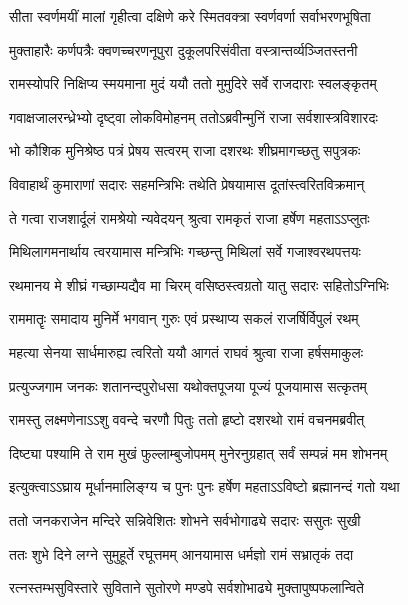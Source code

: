 \twolineshloka
{सीता स्वर्णमयीं मालां गृहीत्वा दक्षिणे करे}
{स्मितवक्त्रा स्वर्णवर्णा सर्वाभरणभूषिता} %

\twolineshloka
{मुक्ताहारैः कर्णपत्रैः क्वणच्चरणनूपुरा}
{दुकूलपरिसंवीता वस्त्रान्तर्व्यञ्जितस्तनी} %

\twolineshloka
{रामस्योपरि निक्षिप्य स्मयमाना मुदं ययौ}
{ततो मुमुदिरे सर्वे राजदाराः स्वलङ्कृतम्} %

\twolineshloka
{गवाक्षजालरन्ध्रेभ्यो दृष्ट्वा लोकविमोहनम्}
{ततोऽब्रवीन्मुनिं राजा सर्वशास्त्रविशारदः} %

\twolineshloka
{भो कौशिक मुनिश्रेष्ठ पत्रं प्रेषय सत्वरम्}
{राजा दशरथः शीघ्रमागच्छतु सपुत्रकः} %

\twolineshloka
{विवाहार्थं कुमाराणां सदारः सहमन्त्रिभिः}
{तथेति प्रेषयामास दूतांस्त्वरितविक्रमान्} %

\twolineshloka
{ते गत्वा राजशार्दूलं रामश्रेयो न्यवेदयन्}
{श्रुत्वा रामकृतं राजा हर्षेण महताऽऽप्लुतः} %

\twolineshloka
{मिथिलागमनार्थाय त्वरयामास मन्त्रिभिः}
{गच्छन्तु मिथिलां सर्वे गजाश्वरथपत्तयः} %

\twolineshloka
{रथमानय मे शीघ्रं गच्छाम्यद्यैव मा चिरम्}
{वसिष्ठस्त्वग्रतो यातु सदारः सहितोऽग्निभिः} %

\twolineshloka
{राममातॄः समादाय मुनिर्मे भगवान् गुरुः}
{एवं प्रस्थाप्य सकलं राजर्षिर्विपुलं रथम्} %

\twolineshloka
{महत्या सेनया सार्धमारुह्य त्वरितो ययौ}
{आगतं राघवं श्रुत्वा राजा हर्षसमाकुलः} %

\twolineshloka
{प्रत्युज्जगाम जनकः शतानन्दपुरोधसा}
{यथोक्तपूजया पूज्यं पूजयामास सत्कृतम्} %

\twolineshloka
{रामस्तु लक्ष्मणेनाऽऽशु ववन्दे चरणौ पितुः}
{ततो हृष्टो दशरथो रामं वचनमब्रवीत्} %

\twolineshloka
{दिष्ट्या पश्यामि ते राम मुखं फुल्लाम्बुजोपमम्}
{मुनेरनुग्रहात् सर्वं सम्पन्नं मम शोभनम्} %

\twolineshloka
{इत्युक्त्वाऽऽघ्राय मूर्धानमालिङ्ग्य च पुनः पुनः}
{हर्षेण महताऽऽविष्टो ब्रह्मानन्दं गतो यथा} %

\twolineshloka
{ततो जनकराजेन मन्दिरे सन्निवेशितः}
{शोभने सर्वभोगाढ्ये सदारः ससुतः सुखी} %

\twolineshloka
{ततः शुभे दिने लग्ने सुमुहूर्ते रघूत्तमम्}
{आनयामास धर्मज्ञो रामं सभ्रातृकं तदा} %

\twolineshloka
{रत्नस्तम्भसुविस्तारे सुविताने सुतोरणे}
{मण्डपे सर्वशोभाढ्ये मुक्तापुष्पफलान्विते} %

